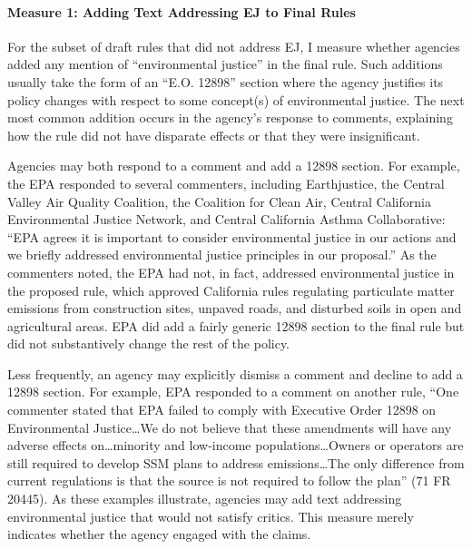 \documentclass[
      12pt,
        ]{article}
\begin{document}
\hypertarget{measure-1-adding-text-addressing-ej-to-final-rules}{%
\paragraph{Measure 1: Adding Text Addressing EJ to Final Rules}\label{measure-1-adding-text-addressing-ej-to-final-rules}}

For the subset of draft rules that did not address EJ, I measure whether agencies added any mention of ``environmental justice'' in the final rule. Such additions usually take the form of an ``E.O. 12898'' section where the agency justifies its policy changes with respect to some concept(s) of environmental justice. The next most common addition occurs in the agency's response to comments, explaining how the rule did not have disparate effects or that they were insignificant.

Agencies may both respond to a comment and add a 12898 section. For example, the EPA responded to several commenters, including Earthjustice, the Central Valley Air Quality Coalition, the Coalition for Clean Air, Central California Environmental Justice Network, and Central California Asthma Collaborative: ``EPA agrees it is important to consider environmental justice in our actions and we briefly addressed environmental justice principles in our proposal.'' As the commenters noted, the EPA had not, in fact, addressed environmental justice in the proposed rule, which approved California rules regulating particulate matter emissions from construction sites, unpaved roads, and disturbed soils in open and agricultural areas. EPA did add a fairly generic 12898 section to the final rule but did not substantively change the rest of the policy.

Less frequently, an agency may explicitly dismiss a comment and decline to add a 12898 section. For example, EPA responded to a comment on another rule, ``One commenter stated that EPA failed to comply with Executive Order 12898 on Environmental Justice\ldots We do not believe that these amendments will have any adverse effects on\ldots minority and low-income populations\ldots Owners or operators are still required to develop SSM plans to address emissions\ldots The only difference from current regulations is that the source is not required to follow the plan'' (71 FR 20445). As these examples illustrate, agencies may add text addressing environmental justice that would not satisfy critics. This measure merely indicates whether the agency engaged with the claims.
\end{document}
